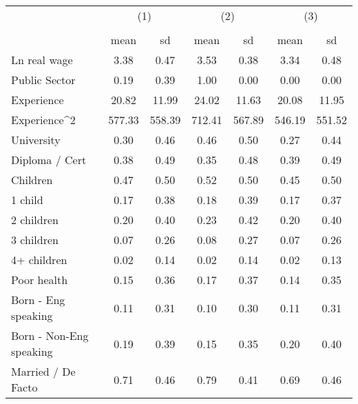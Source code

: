 {
\def\sym#1{\ifmmode^{#1}\else\(^{#1}\)\fi}
\begin{tabular}{l*{3}{cc}}
\hline\hline
                    &\multicolumn{2}{c}{(1)}  &\multicolumn{2}{c}{(2)}  &\multicolumn{2}{c}{(3)}  \\
                    &\multicolumn{2}{c}{}     &\multicolumn{2}{c}{}     &\multicolumn{2}{c}{}     \\
                    &        mean&          sd&        mean&          sd&        mean&          sd\\
\hline
Ln real wage        &        3.38&        0.47&        3.53&        0.38&        3.34&        0.48\\
Public Sector       &        0.19&        0.39&        1.00&        0.00&        0.00&        0.00\\
Experience          &       20.82&       11.99&       24.02&       11.63&       20.08&       11.95\\
Experience^{2}      &      577.33&      558.39&      712.41&      567.89&      546.19&      551.52\\
University          &        0.30&        0.46&        0.46&        0.50&        0.27&        0.44\\
Diploma / Cert      &        0.38&        0.49&        0.35&        0.48&        0.39&        0.49\\
Children            &        0.47&        0.50&        0.52&        0.50&        0.45&        0.50\\
1 child             &        0.17&        0.38&        0.18&        0.39&        0.17&        0.37\\
2 children          &        0.20&        0.40&        0.23&        0.42&        0.20&        0.40\\
3 children          &        0.07&        0.26&        0.08&        0.27&        0.07&        0.26\\
4+ children         &        0.02&        0.14&        0.02&        0.14&        0.02&        0.13\\
Poor health         &        0.15&        0.36&        0.17&        0.37&        0.14&        0.35\\
Born - Eng speaking &        0.11&        0.31&        0.10&        0.30&        0.11&        0.31\\
Born - Non-Eng speaking&        0.19&        0.39&        0.15&        0.35&        0.20&        0.40\\
Married / De Facto  &        0.71&        0.46&        0.79&        0.41&        0.69&        0.46\\

\end{tabular}}
